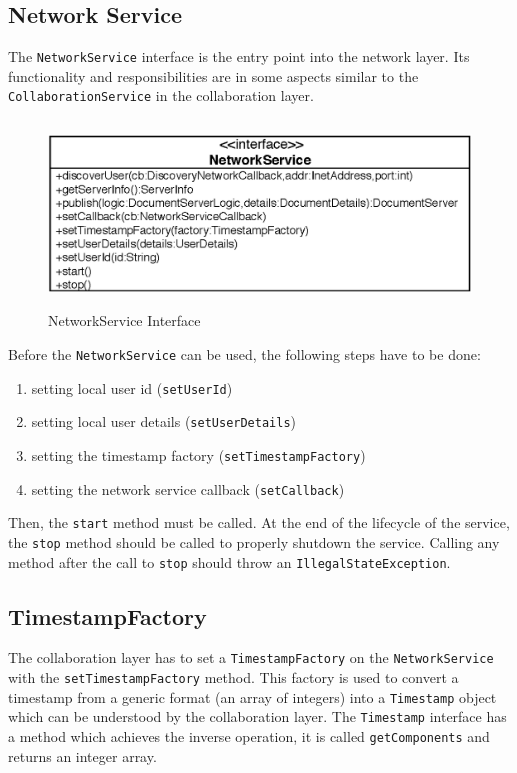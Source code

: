 \subsection{Network Service}
The \texttt{Network\-Service} interface is the entry point into the network 
layer. Its functionality and responsibilities are in some aspects similar to the 
\texttt{Collaboration\-Service} in the collaboration layer. 

\begin{figure}[H]
 \centering
 \includegraphics[width=13.19cm,height=4.94cm]{../images/finalreport/architecture_networkservice_uml.eps}
 \caption{NetworkService Interface}
 \label{fig:archoverview.networkservice}
\end{figure}

Before the \texttt{Network\-Service} can be used, the following steps have
to be done:

\begin{enumerate}
 \item setting local user id (\texttt{set\-User\-Id})
 \item setting local user details (\texttt{set\-User\-Details})
 \item setting the timestamp factory (\texttt{set\-Timestamp\-Factory})
 \item setting the network service callback (\texttt{set\-Callback})
\end{enumerate}

Then, the \texttt{start} method must be called. At the end of the lifecycle
of the service, the \texttt{stop} method should be called to properly shutdown
the service. Calling any method after the call to \texttt{stop} should
throw an \texttt{Illegal\-State\-Exception}.


\subsection{TimestampFactory}
The collaboration layer has to set a \texttt{Timestamp\-Factory} on the
\texttt{NetworkService} with the \texttt{set\-Timestamp\-Factory} method. This
factory is used to convert a timestamp from a generic format (an array of
integers) into a \texttt{Timestamp} object which can be understood by the
collaboration layer. The \texttt{Timestamp} interface has a method which 
achieves the inverse operation, it is called \texttt{get\-Components} and
returns an integer array.

